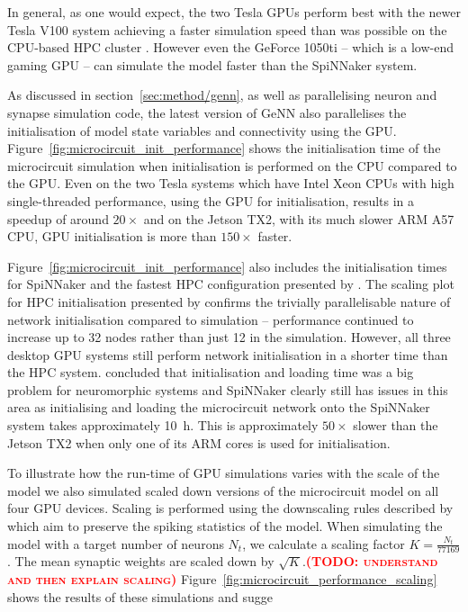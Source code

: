 \documentclass[utf8]{frontiersSCNS} %
\newcommand{\todo}[1]{\textbf{\textsc{\textcolor{red}{(TODO: #1)}}}}
\begin{document}
In general, as one would expect, the two Tesla GPUs perform best with the newer Tesla V100 system achieving a faster simulation speed than was possible on the CPU-based HPC cluster \citep{VanAlbada2018}.
However even the GeForce 1050ti -- which is a low-end gaming GPU -- can simulate the model faster than the SpiNNaker system.

As discussed in section~\ref{sec:method/genn}, as well as parallelising neuron and synapse simulation code, the latest version of GeNN also parallelises the initialisation of model state variables and connectivity using the GPU.
Figure~\ref{fig:microcircuit_init_performance} shows the initialisation time of the microcircuit simulation when initialisation is performed on the CPU compared to the GPU.
Even on the two Tesla systems which have Intel Xeon CPUs with high single-threaded performance, using the GPU for initialisation, results in a speedup of around $20\times$ and on the Jetson TX2, with its much slower ARM A57 CPU, GPU initialisation is more than $150\times$ faster.

Figure~\ref{fig:microcircuit_init_performance} also includes the initialisation times for SpiNNaker and the fastest HPC configuration presented by \citet{VanAlbada2018}.
The scaling plot for HPC initialisation presented by \citeauthor{VanAlbada2018} confirms the trivially parallelisable nature of network initialisation compared to simulation -- performance continued to increase up to 32 nodes rather than just 12 in the simulation.
However, all three desktop GPU systems still perform network initialisation in a shorter time than the HPC system.
\citet{Diamond2018} concluded that initialisation and loading time was a big problem for neuromorphic systems and SpiNNaker clearly still has issues in this area as initialising and loading the microcircuit network onto the SpiNNaker system takes approximately \SI{10}{\hour}.
This is approximately $50\times$ slower than the Jetson TX2 when only one of its ARM cores is used for initialisation.

To illustrate how the run-time of GPU simulations varies with the scale of the model we also simulated scaled down versions of the microcircuit model on all four GPU devices.
Scaling is performed using the downscaling rules described by \citet{VanAlbada2015} which aim to preserve the spiking statistics of the model.
When simulating the model with a target number of neurons $N_t$, we calculate a scaling factor $K = \frac{N_t}{77169}$.
The mean synaptic weights are scaled down by $\sqrt{K}$.\todo{understand and then explain scaling}
Figure~\ref{fig:microcircuit_performance_scaling} shows the results of these simulations and sugge
\end{document}
